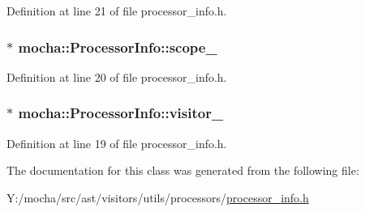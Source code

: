 Definition at line 21 of file processor\_\-info.h.

\hypertarget{classmocha_1_1_processor_info_a8d20024f149113974c3c538bc503a569}{
\subsubsection[{scope\_\-}]{$\ast$ {\bf mocha::ProcessorInfo::scope\_\-}}}
\label{classmocha_1_1_processor_info_a8d20024f149113974c3c538bc503a569}


Definition at line 20 of file processor\_\-info.h.

\hypertarget{classmocha_1_1_processor_info_a48154ca90d0975bd482629d5d738d224}{
\subsubsection[{visitor\_\-}]{$\ast$ {\bf mocha::ProcessorInfo::visitor\_\-}}}
\label{classmocha_1_1_processor_info_a48154ca90d0975bd482629d5d738d224}


Definition at line 19 of file processor\_\-info.h.



The documentation for this class was generated from the following file:\begin{DoxyCompactItemize}
\item 
Y:/mocha/src/ast/visitors/utils/processors/\hyperlink{processor__info_8h}{processor\_\-info.h}\end{DoxyCompactItemize}
